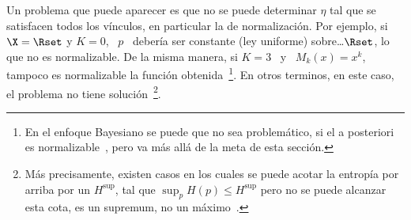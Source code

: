 Un problema que  puede aparecer es que  no se puede determinar $\eta$  tal que se
satisfacen  todos los  v\'inculos,  en particular  la  de normalizaci\'on.   Por
ejemplo,  si $\X  = \Rset$  y $K  = 0$,  \ $p$  \ deber\'ia  ser  constante (ley
uniforme) sobre\ldots $\Rset$, lo que no es normalizable. De la misma manera, si
$K  =  3$  \  y  \   $M_k(x)  =  x^k$,  tampoco  es  normalizable  la  funci\'on
obtenida~\footnote{En el  enfoque Bayesiano se puede que  no sea problem\'atico,
  si el  a posteriori es normalizable~\cite{Rob07},  pero va m\'as  all\'a de la
  meta de  esta secci\'on.}.  En  otros terminos, en  este caso, el  problema no
tiene soluci\'on~\footnote{M\'as  precisamente, existen  casos en los  cuales se
  puede acotar la entrop\'ia por arriba  por un $H^{\sup}$, tal que $\sup_p H(p)
  \le H^{\sup}$ pero no  se puede alcanzar esta cota, \ie es  un supremum, no un
  m\'aximo~\cite[sec.~12.3]{CovTho06}.}.

